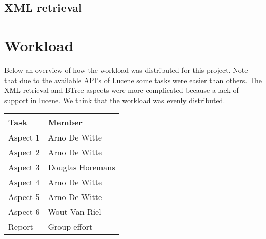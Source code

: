 \documentclass{article}
\begin{document}
\subsection{XML retrieval}

\section{Workload}
Below an overview of how the workload was distributed for this project. Note that due to the available API's of Lucene some tasks were easier than others. The XML retrieval and BTree aspects were more complicated because a lack of support in lucene. We think that the workload was evenly distributed.

\begin{center}
	\begin{tabular}{ | l | l |}
		\hline
		\textbf{Task} & \textbf{Member}  \\ \hline
		Aspect 1      & Arno De Witte    \\ \hline
		Aspect 2      & Arno De Witte    \\ \hline
		Aspect 3      & Douglas Horemans \\ \hline
		Aspect 4      & Arno De Witte    \\ \hline
		Aspect 5      & Arno De Witte    \\ \hline
		Aspect 6      & Wout Van Riel    \\ \hline
		Report        & Group effort     \\ \hline
	\end{tabular}
\end{center}
\end{document}
